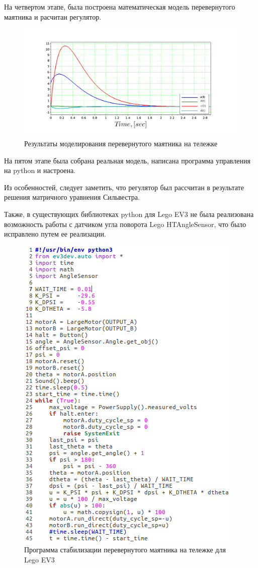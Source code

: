 \documentclass[a4paper,14pt]{extreport}
\begin{document}
	На четвертом этапе, была построена математическая модель перевернутого маятника и расчитан регулятор.
	
	\begin{figure}[H]
		\center\includegraphics[width=1\linewidth]{pend4.png}
		\caption{Результаты моделирования перевернутого маятника на тележке}
		\label{fig:scr1}
	\end{figure}
	
	На пятом этапе была собрана реальная модель, написана программа управления на python и настроена.
	
	Из особенностей, следует заметить, что регулятор был рассчитан в результате решения матричного уравнения Сильвестра.
	
	Также, в существующих библиотеках python для Lego EV3 не была реализована возможность работы с датчиком угла поворота Lego HTAngleSensor, что было исправлено путем ее реализации.
	
	
	\begin{figure}[H]
		\center\includegraphics[width=0.7\linewidth]{listing2.png}
		\caption{Программа стабилизации перевернутого маятника на тележке для Lego EV3}
		\label{fig:scr1}
	\end{figure}
	
\end{document}
